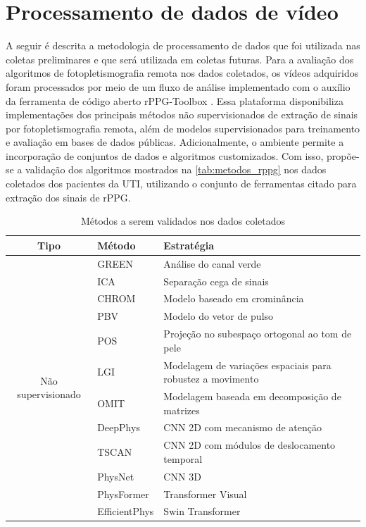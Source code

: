 \section{Processamento de dados de vídeo}

A seguir é descrita  a metodologia de processamento de dados que foi utilizada nas coletas preliminares e que será utilizada em coletas futuras. Para a avaliação dos algoritmos de fotopletismografia remota nos dados coletados, os vídeos adquiridos foram processados por meio de um fluxo de análise implementado com o auxílio da ferramenta de código aberto rPPG-Toolbox \cite{liu2022rppg}. Essa plataforma disponibiliza implementações dos principais métodos não supervisionados de extração de sinais por fotopletismografia remota, além de modelos supervisionados para treinamento e avaliação em bases de dados públicas. Adicionalmente, o ambiente permite a incorporação de conjuntos de dados e algoritmos customizados. Com isso, propõe-se a validação dos algoritmos mostrados na \autoref{tab:metodos_rppg} nos dados coletados dos pacientes da UTI, utilizando o conjunto de ferramentas citado para extração dos sinais de rPPG. 

\begin{table}[ht]
\centering
\caption{Métodos a serem validados nos dados coletados}
\label{tab:metodos_rppg}
\begin{tabular}{|c|l|p{5cm}|}
\hline
\textbf{Tipo} & \textbf{Método} & \textbf{Estratégia} \\ \hline

\multirow{12}{*}{Não supervisionado}
& GREEN \cite{verkruysse2008remote} & Análise do canal verde\\ \cline{2-3}
& ICA \cite{poh2010advancements} & Separação cega de sinais \\ \cline{2-3}
& CHROM \cite{de2013robust} & Modelo baseado em crominância \\ \cline{2-3}
& PBV \cite{de2014improved} & Modelo do vetor de pulso \\ \cline{2-3}
& POS \cite{wang2016algorithmic} & Projeção no subespaço ortogonal ao tom de pele\\ \cline{2-3}
& LGI \cite{pilz2018local} & Modelagem de variações espaciais para robustez a movimento \\ \cline{2-3}
& OMIT \cite{casado2023face2ppg} & Modelagem baseada em decomposição de matrizes \\ \hline

\multirow{7}{*}{Supervisionado}
& DeepPhys \cite{chen2018deepphys} & CNN 2D com mecanismo de atenção \\ \cline{2-3}
& TSCAN \cite{liu2020multi} & CNN 2D com módulos de deslocamento temporal \\ \cline{2-3}
& PhysNet \cite{yu2019physnet} & CNN 3D \\ \cline{2-3}
& PhysFormer \cite{yu2022physformer} & Transformer Visual \\ \cline{2-3}
& EfficientPhys \cite{liu2023efficientphys} & Swin Transformer\\ \hline

\end{tabular}
\end{table}

